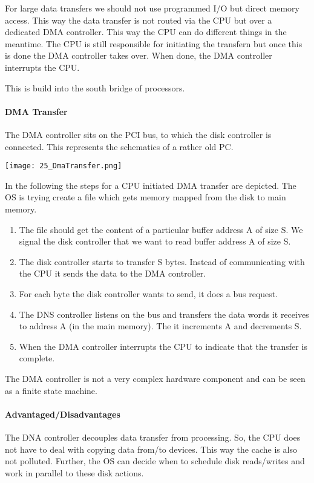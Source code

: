 

For large data transfers we should not use programmed I/O but direct memory access. This way the data transfer is not routed via the CPU but over a dedicated DMA controller. This way the CPU can do different things in the meantime. The CPU is still responsible for initiating the transfern but once this is done the DMA controller takes over. When done, the DMA controller interrupts the CPU.

This is build into the south bridge of processors.

\paragraph{DMA Transfer}
The DMA controller sits on the PCI bus, to which the disk controller is connected. This represents the schematics of a rather old PC.

\texttt{[image: 25\_DmaTransfer.png]}

In the following the steps for a CPU initiated DMA transfer are depicted. The OS is trying create a file which gets memory mapped from the disk to main memory.

\begin{enumerate}
    \item The file should get the content of a particular buffer address A of size S. We signal the disk controller that we want to read buffer address A of size S.
    \item The disk controller starts to transfer S bytes. Instead of communicating with the CPU it sends the data to the DMA controller.
    \item For each byte the disk controller wants to send, it does a bus request.
    \item The DNS controller listens on the bus and transfers the data words it receives to address A (in the main memory). The it increments A and decrements S.
    \item When  the DMA controller interrupts the CPU to indicate that the transfer is complete.
\end{enumerate}

The DMA controller is not a very complex hardware component and can be seen as a finite state machine.

\paragraph{Advantaged/Disadvantages}
The DNA controller decouples data transfer from processing. So, the CPU does not have to deal with copying data from/to devices. This way the cache is also not polluted. Further, the OS can decide when to schedule disk reads/writes and work in parallel to these disk actions.

